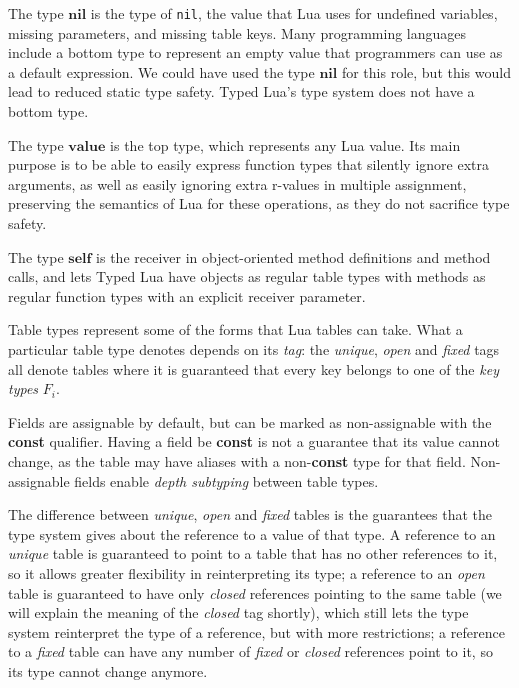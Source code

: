 \documentclass[10pt]{sigplanconf}
\newcommand{\Value}{\mathbf{value}}
\newcommand{\Nil}{\mathbf{nil}}
\newcommand{\Self}{\mathbf{self}}
\begin{document}
The type $\Nil$ is the type of {\tt nil}, the value that Lua uses for undefined variables, missing parameters, and missing table keys.
Many programming languages include a bottom type to represent
an empty value that programmers can use as a default expression.
We could have used the type $\Nil$ for this role, but
this would lead to reduced static type safety. Typed Lua's
type system does not have a bottom type.

The type $\Value$ is the top type, which represents any Lua value.
Its main purpose is to be able to easily express function types
that silently ignore extra arguments, as well as easily ignoring extra r-values in multiple assignment, preserving the semantics of Lua for these operations, as they do not sacrifice type safety.

The type $\Self$ is the receiver in object-oriented method
definitions and method calls, and lets Typed Lua have objects
as regular table types with methods as regular function types
with an explicit receiver parameter.

Table types represent some of the forms that Lua
tables can take. What a particular table type denotes
depends on its {\em tag}: the {\em unique}, {\em open}
and {\em fixed} tags all denote tables where it is
guaranteed that every key belongs to one of the {\em key
types} $F_i$. 

Fields are assignable by default, but can be marked
as non-assignable with the {\bf const} qualifier. Having
a field be {\bf const} is not a guarantee that its
value cannot change, as the table may have aliases with
a non-{\bf const} type for that field. Non-assignable
fields enable {\em depth subtyping} between table types.

The difference between {\em unique}, {\em open} and
{\em fixed} tables is the guarantees that the type system
gives about the reference to a value of that type. A
reference to an {\em unique} table is guaranteed to
point to a table that has no other references to it,
so it allows greater flexibility in reinterpreting its type;
a reference to an {\em open} table is guaranteed to have
only {\em closed} references pointing to the
same table (we will explain the meaning of the {\em closed} tag shortly), which still lets the type system
reinterpret the type of a reference, but with more
restrictions; a reference to a {\em fixed} table can have any number of
{\em fixed} or {\em closed} references point to it, 
so its type cannot change
anymore.
\end{document}
